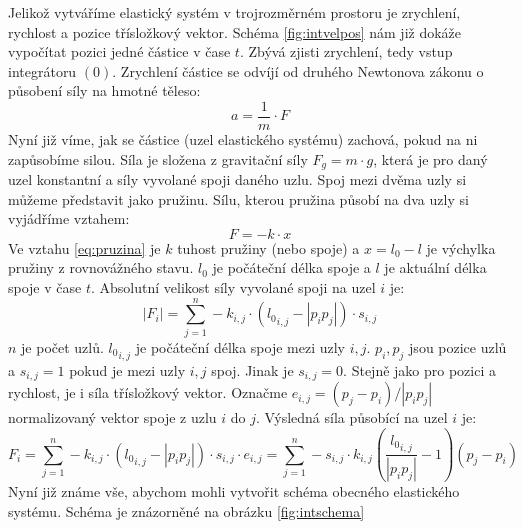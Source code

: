 Jelikož vytváříme elastický systém v trojrozměrném prostoru je zrychlení, rychlost a pozice třísložkový vektor.
Schéma \ref{fig:intvelpos} nám již dokáže vypočítat pozici jedné částice v čase $t$.
Zbývá zjisti zrychlení, tedy vstup integrátoru $(0)$.
Zrychlení částice se odvíjí od druhého Newtonova zákonu o působení síly na hmotné těleso:
\begin{equation}
\label{eq:newton}
a=\frac{1}{m} \cdot F
\end{equation}
Nyní již víme, jak se částice (uzel elastického systému) zachová, pokud na ni zapůsobíme silou.
Síla je složena z gravitační síly $F_g=m \cdot g$, která je pro daný uzel konstantní a síly vyvolané spoji daného uzlu.
Spoj mezi dvěma uzly si můžeme představit jako pružinu.
Sílu, kterou pružina působí na dva uzly si vyjádříme vztahem:
\begin{equation}
\label{eq:pruzina}
F=-k \cdot x
\end{equation}
Ve vztahu \ref{eq:pruzina} je $k$ tuhost pružiny (nebo spoje) a $x=l_0-l$ je výchylka pružiny z rovnovážného stavu.
$l_0$ je počáteční délka spoje a $l$ je aktuální délka spoje v čase $t$.
Absolutní velikost síly vyvolané spoji na uzel $i$ je:
\begin{equation}
\label{eq:sumpruz}
|F_i|=\sum_{j=1}^n -k_{i,j} \cdot ({l_0}_{i,j}-|p_i p_j|) \cdot s_{i,j}
\end{equation}
$n$ je počet uzlů.
${l_0}_{i,j}$ je počáteční délka spoje mezi uzly $i,j$.
$p_i,p_j$ jsou pozice uzlů a $s_{i,j}=1$ pokud je mezi uzly $i,j$ spoj.
Jinak je $s_{i,j}=0$.
Stejně jako pro pozici a rychlost, je i síla třísložkový vektor.
Označme $e_{i,j}=(p_j-p_i)/|p_i p_j|$ normalizovaný vektor spoje z uzlu $i$ do $j$.
Výsledná síla působící na uzel $i$ je:
\begin{equation}
\label{eq:sumpruz1}
F_i=\sum_{j=1}^n -k_{i,j} \cdot ({l_0}_{i,j}-|p_i p_j|) \cdot s_{i,j} \cdot e_{i,j} =
\sum_{j=1}^n -s_{i,j} \cdot k_{i,j} \left( \frac{{l_0}_{i,j}}{|p_i p_j|}-1 \right) (p_j-p_i)
\end{equation}
Nyní již známe vše, abychom mohli vytvořit schéma obecného elastického systému.
Schéma je znázorněné na obrázku \ref{fig:intschema}
